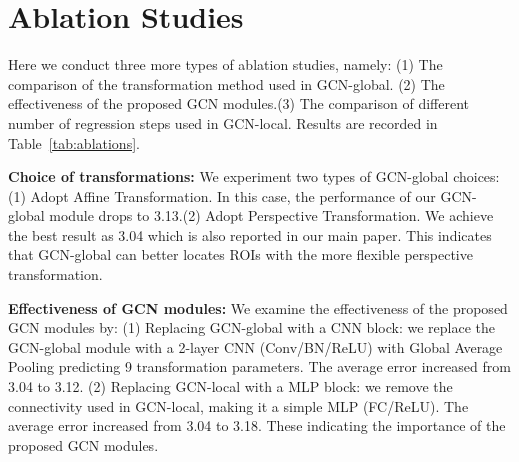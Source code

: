 \documentclass[runningheads]{llncs}
\begin{document}
\section{Ablation Studies} 
Here we conduct three more types of ablation studies, namely: (1) The comparison of the transformation method used in GCN-global. (2) The effectiveness of the proposed GCN modules.(3) The comparison of different number of regression steps used in GCN-local. Results are recorded in Table~\ref{tab:ablations}.
\begin{table}[t]
    \centering
{}
\end{table}


\textbf{Choice of transformations:} We experiment two types of GCN-global choices: (1) Adopt Affine Transformation. In this case, the performance of our GCN-global module drops to 3.13.(2) Adopt Perspective Transformation. We achieve the best result as 3.04 which is also reported in our main paper. This indicates that GCN-global can better locates ROIs with the more flexible perspective transformation.

\textbf{Effectiveness of GCN modules:} We examine the effectiveness of the proposed GCN modules by: (1) Replacing GCN-global with a CNN block: we replace the GCN-global module with a 2-layer CNN (Conv/BN/ReLU) with Global Average Pooling predicting 9 transformation parameters. The average error increased from 3.04 to 3.12. (2) Replacing GCN-local with a MLP block: we remove the connectivity used in GCN-local, making it a simple MLP (FC/ReLU). The average error increased from 3.04 to 3.18. These indicating the importance of the proposed GCN modules.
\end{document}
